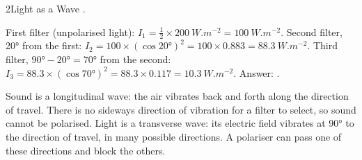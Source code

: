 \begin{chapteranswers}{2}{Light as a Wave}
        .
  \item First filter (unpolarised light): $I_1 = \tfrac{1}{2} \times \qty{200}{W.m^{-2}}
        = \qty{100}{W.m^{-2}}$. Second filter, \ang{20} from the first:
        $I_2 = 100 \times (\cos\ang{20})^2 = 100 \times 0.883 = \qty{88.3}{W.m^{-2}}$.
        Third filter, $\ang{90} - \ang{20} = \ang{70}$ from the second:
        $I_3 = 88.3 \times (\cos\ang{70})^2 = 88.3 \times 0.117 = \qty{10.3}{W.m^{-2}}$.
        Answer: .
  \item Sound is a longitudinal wave: the air vibrates back and forth along the direction
        of travel. There is no sideways direction of vibration for a filter to select, so
        sound cannot be polarised. Light is a transverse wave: its electric field
        vibrates at \ang{90} to the direction of travel, in many possible directions. A
        polariser can pass one of these directions and block the others.
\end{chapteranswers}
